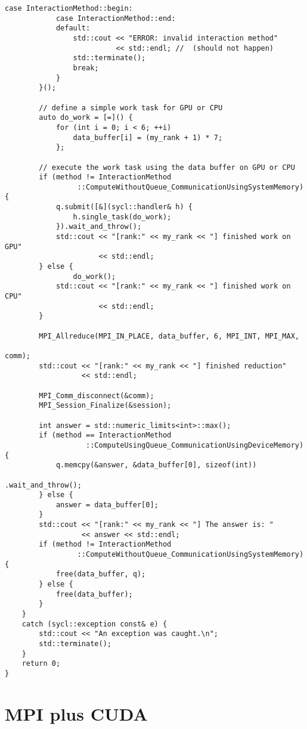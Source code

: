 \begin{example}
\begin{lstlisting}[language={[MPI]C++}]
            case InteractionMethod::begin:
            case InteractionMethod::end:
            default:
                std::cout << "ERROR: invalid interaction method"
                          << std::endl; //  (should not happen)
                std::terminate();
                break;
            }
        }();

        // define a simple work task for GPU or CPU
        auto do_work = [=]() {
            for (int i = 0; i < 6; ++i)
                data_buffer[i] = (my_rank + 1) * 7;
            };

        // execute the work task using the data buffer on GPU or CPU
        if (method != InteractionMethod
                 ::ComputeWithoutQueue_CommunicationUsingSystemMemory) {
            q.submit([&](sycl::handler& h) {
                h.single_task(do_work);
            }).wait_and_throw();
            std::cout << "[rank:" << my_rank << "] finished work on GPU"
                      << std::endl;
        } else {
                do_work();
            std::cout << "[rank:" << my_rank << "] finished work on CPU"
                      << std::endl;
        }

        MPI_Allreduce(MPI_IN_PLACE, data_buffer, 6, MPI_INT, MPI_MAX,
                                                                  comm);
        std::cout << "[rank:" << my_rank << "] finished reduction"
                  << std::endl;

        MPI_Comm_disconnect(&comm);
        MPI_Session_Finalize(&session);

        int answer = std::numeric_limits<int>::max();
        if (method == InteractionMethod
                   ::ComputeUsingQueue_CommunicationUsingDeviceMemory) {
            q.memcpy(&answer, &data_buffer[0], sizeof(int))
                                                      .wait_and_throw();
        } else {
            answer = data_buffer[0];
        }
        std::cout << "[rank:" << my_rank << "] The answer is: "
                  << answer << std::endl;
        if (method != InteractionMethod
                 ::ComputeWithoutQueue_CommunicationUsingSystemMemory) {
            free(data_buffer, q);
        } else {
            free(data_buffer);
        }
    }
    catch (sycl::exception const& e) {
        std::cout << "An exception was caught.\n";
        std::terminate();
    }
    return 0;
}
\end{lstlisting}
\end{example}

\section{MPI plus CUDA}

